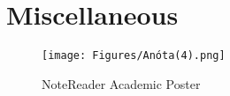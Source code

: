 \chapter{Miscellaneous}

\begin{figure}
    \centering
    \texttt{[image: Figures/Anóta(4).png]}
    \caption{NoteReader Academic Poster}
    \label{fig:enter-label}
\end{figure}